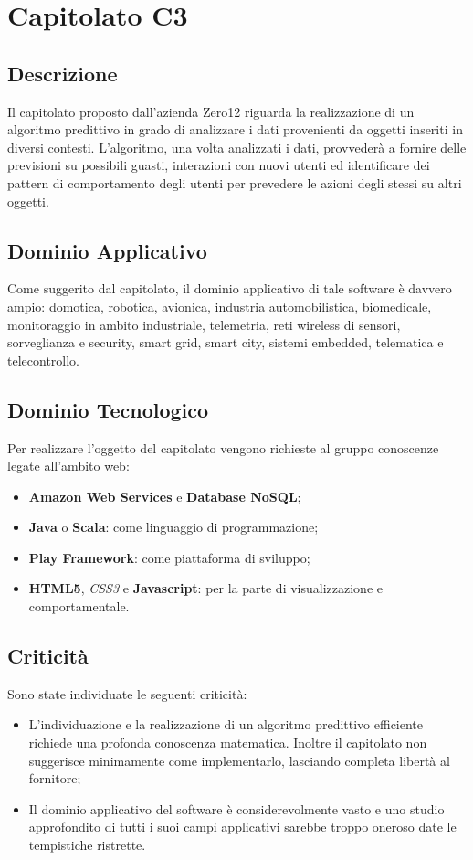 \newpage
\section{Capitolato C3}
\subsection{Descrizione}
Il capitolato proposto dall'azienda Zero12 riguarda la realizzazione di un algoritmo predittivo in grado di analizzare i dati provenienti da oggetti inseriti in diversi contesti. L'algoritmo, una volta analizzati i dati, provvederà a fornire delle previsioni su possibili guasti, interazioni con nuovi utenti ed identificare dei pattern di comportamento degli utenti per prevedere le azioni degli stessi su altri oggetti.

\subsection{Dominio Applicativo}
Come suggerito dal capitolato, il dominio applicativo di tale software è davvero ampio: domotica, robotica, avionica, industria automobilistica, biomedicale, monitoraggio in ambito industriale, telemetria, reti wireless di sensori, sorveglianza e security, smart grid, smart city, sistemi embedded, telematica e telecontrollo.

\subsection{Dominio Tecnologico}
Per realizzare l'oggetto del capitolato vengono richieste al gruppo conoscenze legate all'ambito web:
\begin{itemize}
\item \textbf{Amazon Web Services} e \textbf{Database NoSQL};
\item \textbf{Java} o \textbf{Scala}: come linguaggio di programmazione;
\item \textbf{Play Framework}: come piattaforma di sviluppo;
\item \textbf{HTML5}, \textit{CSS3} e \textbf{Javascript}: per la parte di visualizzazione e comportamentale.
\end{itemize}

\subsection{Criticità}
Sono state individuate le seguenti criticità:
\begin{itemize}
\item L'individuazione e la realizzazione di un algoritmo predittivo efficiente richiede una profonda conoscenza matematica. Inoltre il capitolato non suggerisce minimamente come implementarlo, lasciando completa libertà al fornitore;
\item Il dominio applicativo del software è considerevolmente vasto e uno studio approfondito di tutti i suoi campi applicativi sarebbe troppo oneroso date le tempistiche ristrette.
\end{itemize}

